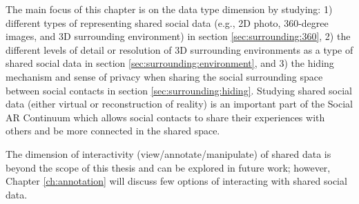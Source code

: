 The main focus of this chapter is on the data type dimension by studying: 1) different types of representing shared social data (e.g., 2D photo, 360-degree images, and 3D surrounding environment) in section \ref{sec:surrounding:360}, 2) the different levels of detail or resolution of 3D surrounding environments as a type of shared social data in section \ref{sec:surrounding:environment}, and 3) the hiding mechanism and sense of privacy when sharing the social surrounding space between social contacts in section \ref{sec:surrounding:hiding}. Studying shared social data (either virtual or reconstruction of reality) is an important part of the Social AR Continuum which allows social contacts to share their experiences with others and be more connected in the shared space. 

The dimension of interactivity (view/annotate/manipulate) of shared data is beyond the scope of this thesis and can be explored in future work; however, Chapter \ref{ch:annotation} will discuss few options of interacting with shared social data.






